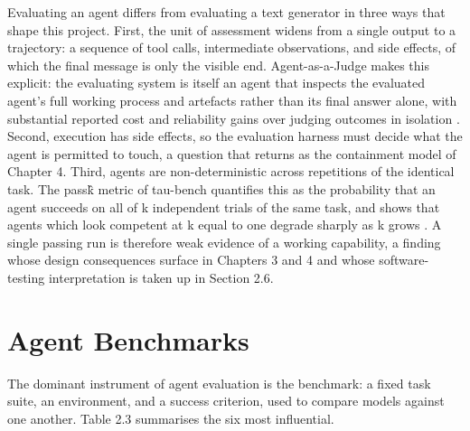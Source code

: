 Evaluating an agent differs from evaluating a text generator in three ways that shape this project. First, the unit of assessment widens from a single output to a trajectory: a sequence of tool calls, intermediate observations, and side effects, of which the final message is only the visible end. Agent-as-a-Judge makes this explicit: the evaluating system is itself an agent that inspects the evaluated agent's full working process and artefacts rather than its final answer alone, with substantial reported cost and reliability gains over judging outcomes in isolation \cite{zhuge2024agentasajudge}. Second, execution has side effects, so the evaluation harness must decide what the agent is permitted to touch, a question that returns as the containment model of Chapter 4. Third, agents are non-deterministic across repetitions of the identical task. The pass\^k metric of tau-bench quantifies this as the probability that an agent succeeds on all of k independent trials of the same task, and shows that agents which look competent at k equal to one degrade sharply as k grows \cite{yao2024taubench}. A single passing run is therefore weak evidence of a working capability, a finding whose design consequences surface in Chapters 3 and 4 and whose software-testing interpretation is taken up in Section 2.6.

\section{Agent Benchmarks}
The dominant instrument of agent evaluation is the benchmark: a fixed task suite, an environment, and a success criterion, used to compare models against one another. Table 2.3 summarises the six most influential.

